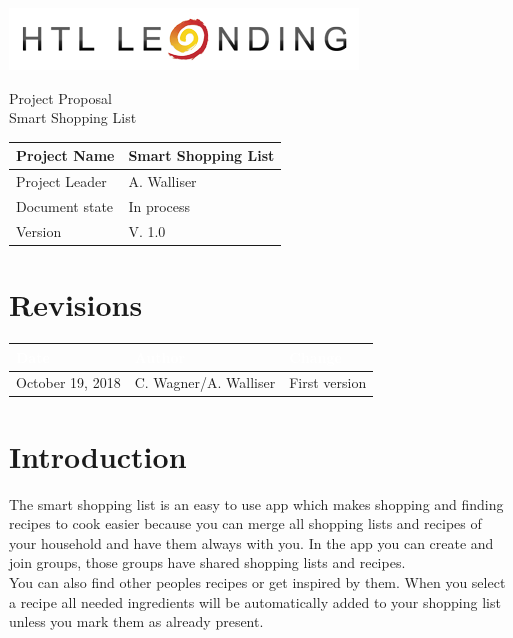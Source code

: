 \documentclass[12pt]{article}
\theoremstyle{definition}
\newenvironment{textblock}{%
   \setlength{\parindent}{0pt}
   \large
   
}{}
\newcommand{\projectname}{Smart Shopping List}
\newcommand{\productname}{Smart Shopping List}
\newcommand{\projectleader}{A. Walliser}
\newcommand{\documentstatus}{In process}
\newcommand{\version}{V. 1.0}
\begin{document}
\begin{titlepage}
\begin{flushright}
\includegraphics[scale=.5]{htlleondinglogo.png}\\
\end{flushright}

\vspace{10em}

\begin{center}
{\Huge Project Proposal} \\[3em]
{\LARGE \productname} \\[3em]
\end{center}

\begin{flushleft}
\begin{tabular}{|l|l|}
\hline
Project Name & \projectname \\ \hline
Project Leader & \projectleader \\ \hline
Document state & \documentstatus \\ \hline
Version & \version \\ \hline
\end{tabular}
\end{flushleft}

\end{titlepage}
\section*{Revisions}
\begin{tabular}{|l|l|l|}
\hline
\cellcolor[gray]{0.5}\textcolor{white}{Date} & \cellcolor[gray]{0.5}\textcolor{white}{Author} & \cellcolor[gray]{0.5}\textcolor{white}{Change} \\ \hline
October 19, 2018&C. Wagner/A. Walliser&First version \\ \hline
\end{tabular}
\pagebreak

\tableofcontents
\pagebreak

\section{Introduction}

\begin{textblock}
The smart shopping list is an easy to use app which makes shopping and finding recipes to cook easier because you can merge all shopping lists and recipes of your household and have them always with you. In the app you can create and join groups, those groups have shared shopping lists and recipes. \\
You can also find other peoples recipes or get inspired by them. When you select a recipe all needed ingredients will be automatically added to your shopping list unless you mark them as already present. 
\end{textblock}
\pagebreak
\end{document}
